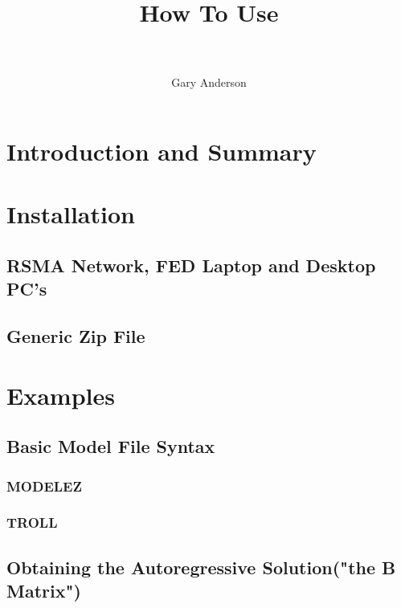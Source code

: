\documentclass[12pt]{article}
\title{How To Use \\ \sps\\
}
\author{Gary Anderson}
\begin{document}

\maketitle

\tableofcontents

\section{Introduction and Summary}
\label{sec:intro}




\section{Installation}
\label{sec:install}


\subsection{RSMA Network, FED Laptop and Desktop PC's}
\label{sec:boardinstall}




\subsection{Generic Zip File}
\label{sec:zipinstall}



\section{Examples}
\label{sec:examples}

\subsection{Basic Model File Syntax}
\label{sec:syntax}


\subsubsection{MODELEZ}


\subsubsection{TROLL}


\subsection{Obtaining the Autoregressive Solution("the B Matrix")}
\end{document}
